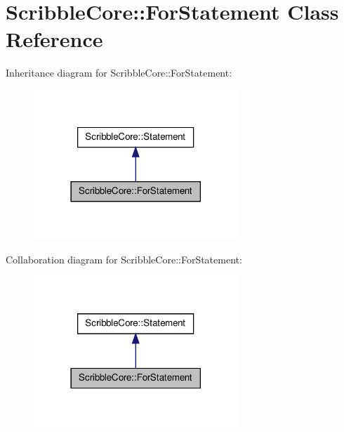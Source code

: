 \hypertarget{class_scribble_core_1_1_for_statement}{\section{Scribble\-Core\-:\-:For\-Statement Class Reference}
\label{class_scribble_core_1_1_for_statement}
}


Inheritance diagram for Scribble\-Core\-:\-:For\-Statement\-:
\nopagebreak
\begin{figure}[H]
\begin{center}
\leavevmode
\includegraphics[width=218pt]{class_scribble_core_1_1_for_statement__inherit__graph}
\end{center}
\end{figure}


Collaboration diagram for Scribble\-Core\-:\-:For\-Statement\-:
\nopagebreak
\begin{figure}[H]
\begin{center}
\leavevmode
\includegraphics[width=218pt]{class_scribble_core_1_1_for_statement__coll__graph}
\end{center}
\end{figure}
